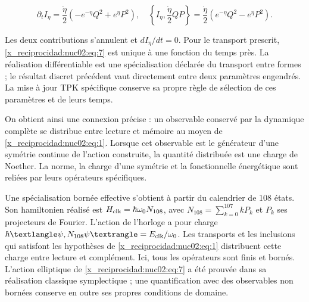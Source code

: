 \[
\partial_tI_\eta=\frac{\dot\eta}{2}(-e^{-\eta}Q^2+e^\eta P^2),
\quad
\left\{I_\eta,\frac{\dot\eta}{2}QP\right\}
=\frac{\dot\eta}{2}(e^{-\eta}Q^2-e^\eta P^2).
\]

Les deux contributions s’annulent et \(dI_\eta/dt=0\). Pour le transport prescrit, \eqref{x_reciprocidad:nuc02:eq:7} est unique à une fonction du temps près. La réalisation différentiable est une spécialisation déclarée du transport entre formes ; le résultat discret précédent vaut directement entre deux paramètres engendrés. La mise à jour TPK spécifique conserve sa propre règle de sélection de ces paramètres et de leurs temps.

On obtient ainsi une connexion précise : un observable conservé par la dynamique complète se distribue entre lecture et mémoire au moyen de \eqref{x_reciprocidad:nuc02:eq:1}. Lorsque cet observable est le générateur d’une symétrie continue de l’action construite, la quantité distribuée est une charge de Noether. La norme, la charge d’une symétrie et la fonctionnelle énergétique sont reliées par leurs opérateurs spécifiques.

Une spécialisation bornée effective s’obtient à partir du calendrier de 108 états. Son hamiltonien réalisé est \(H_{\rm clk}=\hbar\omega_0N_{108}\), avec \(N_{108}=\sum_{k=0}^{107}kP_k\) et \(P_k\) ses projecteurs de Fourier. L’action de l’horloge a pour charge \(\hbar\langle\psi,N_{108}\psi\rangle=E_{\rm clk}/\omega_0\). Les transports et les inclusions qui satisfont les hypothèses de \eqref{x_reciprocidad:nuc02:eq:1} distribuent cette charge entre lecture et complément. Ici, tous les opérateurs sont finis et bornés. L’action elliptique de \eqref{x_reciprocidad:nuc02:eq:7} a été prouvée dans sa réalisation classique symplectique ; une quantification avec des observables non bornées conserve en outre ses propres conditions de domaine.
